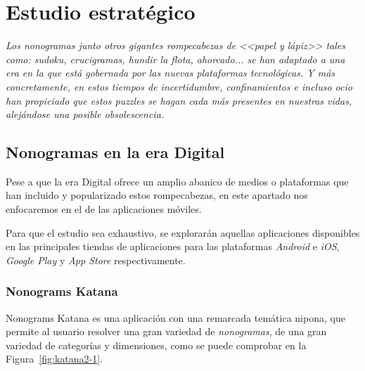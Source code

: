 \chapter{Estudio estratégico}
\textit{Los \textit{nonogramas} junto otros gigantes rompecabezas de <<papel y lápiz>> tales como: sudoku, crucigramas, hundir la flota, ahorcado... se han adaptado a
una era en la que está gobernada por las nuevas plataformas tecnológicas. Y más concretamente, en estos tiempos de incertidumbre, confinamientos e incluso ocio han propiciado que estos
puzzles se hagan cada más presentes en nuestras vidas, alejándose una posible obsolescencia.}

\section{Nonogramas en la era Digital}

Pese a que la era Digital ofrece un amplio abanico de medios o plataformas que han incluido y popularizado estos rompecabezas, en
este apartado nos enfocaremos en el de las aplicaciones móviles.

Para que el estudio sea exhaustivo, se explorarán aquellas aplicaciones disponibles en las principales tiendas de aplicaciones para 
las plataformas \textit{Android} e \textit{iOS}, \textit{Google Play} y \textit{App Store} respectivamente.

\subsection{Nonograms Katana}
Nonograms Katana es una aplicación con una remarcada temática nipona, que permite al usuario resolver una gran variedad de \textit{nonogramas},
de una gran variedad de categorías y dimensiones, como se puede comprobar en la Figura~\ref{fig:katana2-1}.

